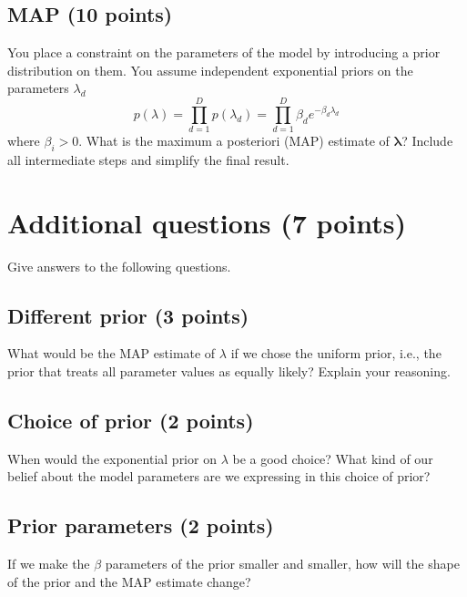 \documentclass[a4paper,12pt]{article}
\begin{document}
\subsection{MAP (10 points)}
You place a constraint on the parameters of the model by introducing a prior distribution on them. You assume independent exponential priors on the parameters $\lambda_{d}$
$$
p\left(\lambda\right)= \prod_{d=1}^{D}p\left(\lambda_d\right) = \prod_{d=1}^D\beta_de^{-\beta_d \lambda_d}
$$
where $\beta_i > 0$. What is the maximum a posteriori (MAP) estimate of $\mathbf{\lambda}$?
Include all intermediate steps and simplify the final result.

\section{Additional questions (7 points)}
Give answers to the following questions.

\subsection{Different prior (3 points)}
What would be the MAP estimate of $\lambda$ if we chose the uniform prior, i.e., the prior that treats all parameter values as equally likely? Explain your reasoning.

\subsection{Choice of prior (2 points)}
When would the exponential prior on $\lambda$ be a good choice? What kind of our belief about the model parameters are we expressing in this choice of prior?

\subsection{Prior parameters (2 points)}
If we make the $\beta$ parameters of the prior smaller and smaller, how will the shape of the prior and the MAP estimate change?
\end{document}

